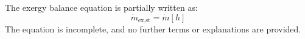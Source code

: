 The exergy balance equation is partially written as:  
\[
\dot{m}_{\text{ex,st}} = \dot{m} \left[ h \right]
\]  
The equation is incomplete, and no further terms or explanations are provided.